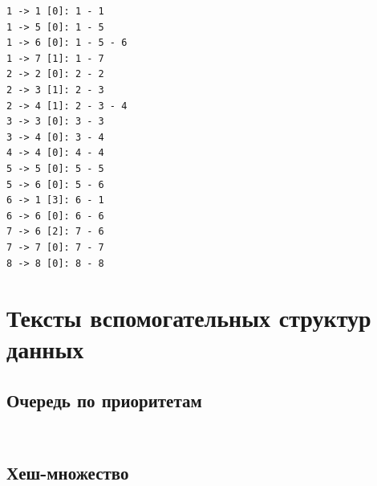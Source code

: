 \documentclass[12pt, a4paper]{article}
\begin{document}
\begin{verbatim}
1 -> 1 [0]: 1 - 1
1 -> 5 [0]: 1 - 5
1 -> 6 [0]: 1 - 5 - 6
1 -> 7 [1]: 1 - 7
2 -> 2 [0]: 2 - 2
2 -> 3 [1]: 2 - 3
2 -> 4 [1]: 2 - 3 - 4
3 -> 3 [0]: 3 - 3
3 -> 4 [0]: 3 - 4
4 -> 4 [0]: 4 - 4
5 -> 5 [0]: 5 - 5
5 -> 6 [0]: 5 - 6
6 -> 1 [3]: 6 - 1
6 -> 6 [0]: 6 - 6
7 -> 6 [2]: 7 - 6
7 -> 7 [0]: 7 - 7
8 -> 8 [0]: 8 - 8
\end{verbatim}

\section{Тексты вспомогательных структур данных}

\subsection{Очередь по приоритетам}
\inputminted[firstline=4, lastline=88]{c}{/home/mehandes/c/src/github.com/meha4j/math/gds/include/gds/pque.h}
\inputminted[firstline=6, lastline=150]{c}{/home/mehandes/c/src/github.com/meha4j/math/gds/src/ppque.c}

\subsection{Хеш-множество}
\inputminted[firstline=6, lastline=65]{c}{/home/mehandes/c/src/github.com/meha4j/math/gds/include/gds/hset.h}
\inputminted[firstline=7, lastline=84]{c}{/home/mehandes/c/src/github.com/meha4j/math/gds/src/ihset.c}
\end{document}
